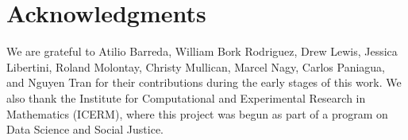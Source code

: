 \documentclass[11pt]{article}
\begin{document}



\section*{Acknowledgments}

We are grateful to Atilio Barreda, William Bork Rodriguez, Drew Lewis, Jessica Libertini, Roland Molontay, Christy Mullican, Marcel Nagy, Carlos Paniagua, and Nguyen Tran for their contributions during the early stages of this work. We also thank the Institute for Computational and Experimental Research in Mathematics (ICERM), where this project was begun as part of a program on Data Science and Social Justice.
\end{document}
